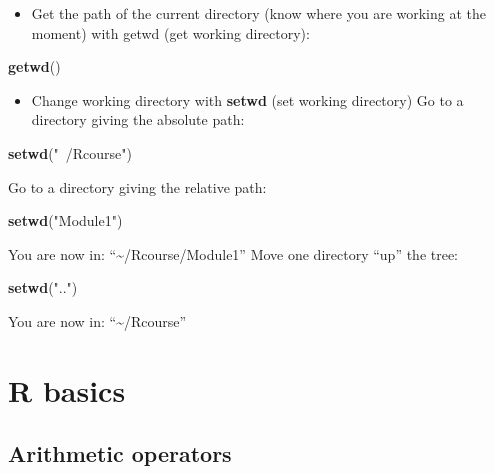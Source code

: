 \documentclass[]{book}
\newenvironment{Shaded}{\begin{snugshade}}{\end{snugshade}}
\newcommand{\KeywordTok}[1]{\textcolor[rgb]{0.13,0.29,0.53}{\textbf{#1}}}
\newcommand{\NormalTok}[1]{#1}
\newcommand{\StringTok}[1]{\textcolor[rgb]{0.31,0.60,0.02}{#1}}
\providecommand{\tightlist}{%
  \setlength{\itemsep}{0pt}\setlength{\parskip}{0pt}}
\begin{document}
\begin{itemize}
\tightlist
\item
  Get the path of the current directory (know where you are working at the moment) with getwd (get working directory):
\end{itemize}

\begin{Shaded}
\begin{Highlighting}[]
\KeywordTok{getwd}\NormalTok{()}
\end{Highlighting}
\end{Shaded}

\begin{itemize}
\tightlist
\item
  Change working directory with \textbf{setwd} (set working directory)
  Go to a directory giving the absolute path:
\end{itemize}

\begin{Shaded}
\begin{Highlighting}[]
\KeywordTok{setwd}\NormalTok{(}\StringTok{"~/Rcourse"}\NormalTok{)}
\end{Highlighting}
\end{Shaded}

Go to a directory giving the relative path:

\begin{Shaded}
\begin{Highlighting}[]
\KeywordTok{setwd}\NormalTok{(}\StringTok{"Module1"}\NormalTok{)}
\end{Highlighting}
\end{Shaded}

You are now in: ``\textasciitilde{}/Rcourse/Module1''
Move one directory ``up'' the tree:

\begin{Shaded}
\begin{Highlighting}[]
\KeywordTok{setwd}\NormalTok{(}\StringTok{".."}\NormalTok{)}
\end{Highlighting}
\end{Shaded}

You are now in: ``\textasciitilde{}/Rcourse''

\hypertarget{r-basics}{%
\chapter{R basics}\label{r-basics}}

\hypertarget{arithmetic-operators}{%
\section{Arithmetic operators}\label{arithmetic-operators}}
\end{document}
